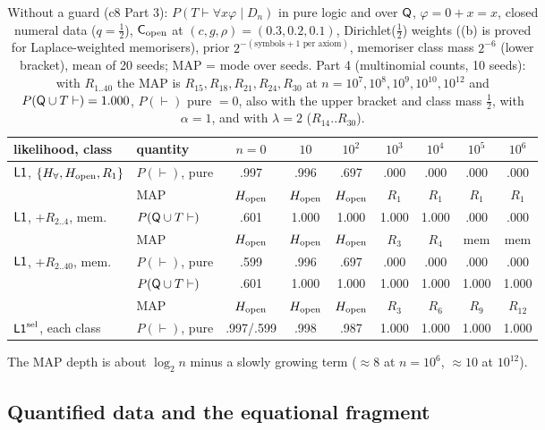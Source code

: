 \begin{table}[ht]
\centering\small
\setlength{\tabcolsep}{4.5pt}
\begin{tabular}{@{}llccccccc@{}}
\toprule
likelihood, class & quantity & $n=0$ & $10$ & $10^2$ & $10^3$ & $10^4$ & $10^5$ & $10^6$\\
\midrule
$\mathord{\mathsf{L1}}$, $\{H_{\forall},H_{\mathrm{open}},R_1\}$ & $P(\vdash)$, pure & .997 & .996 & .697 & .000 & .000 & .000 & .000\\
 & MAP & $H_{\mathrm{open}}$ & $H_{\mathrm{open}}$ & $H_{\mathrm{open}}$ & $R_1$ & $R_1$ & $R_1$ & $R_1$\\
$\mathord{\mathsf{L1}}$, $+R_{2..4}$, mem. & $P(\mathsf{Q}\cup T\vdash)$ & .601 & 1.000 & 1.000 & 1.000 & 1.000 & .000 & .000\\
 & MAP & $H_{\mathrm{open}}$ & $H_{\mathrm{open}}$ & $H_{\mathrm{open}}$ & $R_3$ & $R_4$ & mem & mem\\
$\mathord{\mathsf{L1}}$, $+R_{2..40}$, mem. & $P(\vdash)$, pure & .599 & .996 & .697 & .000 & .000 & .000 & .000\\
 & $P(\mathsf{Q}\cup T\vdash)$ & .601 & 1.000 & 1.000 & 1.000 & 1.000 & 1.000 & 1.000\\
 & MAP & $H_{\mathrm{open}}$ & $H_{\mathrm{open}}$ & $H_{\mathrm{open}}$ & $R_3$ & $R_6$ & $R_9$ & $R_{12}$\\
$\mathord{\mathsf{L1}}^{\mathrm{sel}}$, each class & $P(\vdash)$, pure & .997/.599 & .998 & .987 & 1.000 & 1.000 & 1.000 & 1.000\\
\bottomrule
\end{tabular}
\caption{Without a guard (c8 Part 3): $P(T\vdash\forall x\varphi\mid D_n)$ in pure logic and over $\mathsf{Q}$, $\varphi=0+x=x$, closed numeral data ($q=\tfrac12$), $\mathsf{C}_{\mathrm{open}}$ at $(c,g,\rho)=(0.3,0.2,0.1)$, Dirichlet($\tfrac12$) weights ((b) is proved for Laplace-weighted memorisers), prior $2^{-(\text{symbols}+1\text{ per axiom})}$, memoriser class mass $2^{-6}$ (lower bracket), mean of 20 seeds; MAP = mode over seeds. Part 4 (multinomial counts, 10 seeds): with $R_{1..40}$ the MAP is $R_{15},R_{18},R_{21},R_{24},R_{30}$ at $n=10^7,10^8,10^9,10^{10},10^{12}$ and $P(\mathsf{Q}\cup T\vdash)=1.000$, $P(\vdash)$ pure $=0$, also with the upper bracket and class mass $\tfrac12$, with $\alpha=1$, and with $\lambda=2$ ($R_{14}..R_{30}$).}
\label{tab:univ:noguard}
\end{table}

The MAP depth is about $\log_2n$ minus a slowly growing term ($\approx8$ at $n=10^6$, $\approx10$ at $10^{12}$).

\subsection{Quantified data and the equational fragment}\label{app:univ:quant}

